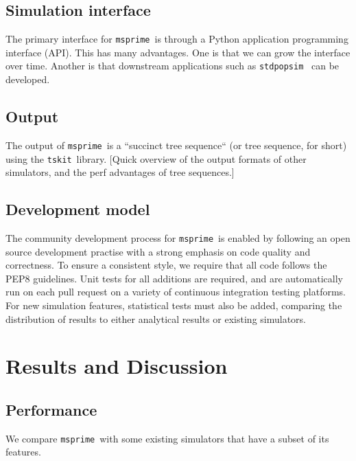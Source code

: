 \documentclass{article}
\newcommand{\msprime}[0]{\texttt{msprime}}
\newcommand{\tskit}[0]{\texttt{tskit}}
\begin{document}
\subsection*{Simulation interface}
The primary interface for \msprime\ is through a Python application
programming interface (API). This has many advantages. One is
that we can grow the interface over time. Another is that
downstream applications such as \texttt{stdpopsim}~\citep{adrion2019community}
can be developed.

\subsection*{Output}
The output of \msprime\ is a ``succinct tree sequence`` (or tree sequence,
for short) using the \tskit\ library. [Quick overview of the output formats
of other simulators, and the perf advantages of tree sequences.]

\subsection*{Development model}
The community development process for \msprime\ is enabled by following an
open source development practise with a strong emphasis on code quality
and correctness. To ensure a consistent style, we require that all code
follows the PEP8 guidelines. Unit tests for all additions are required, and
are automatically run on each pull request on a variety of continuous
integration testing platforms. For new simulation features, statistical tests
must also be added, comparing the distribution of results to either analytical
results or existing simulators.



\section*{Results and Discussion}
\subsection*{Performance}
We compare \msprime\ with some existing simulators that have a subset of its
features.
\end{document}
